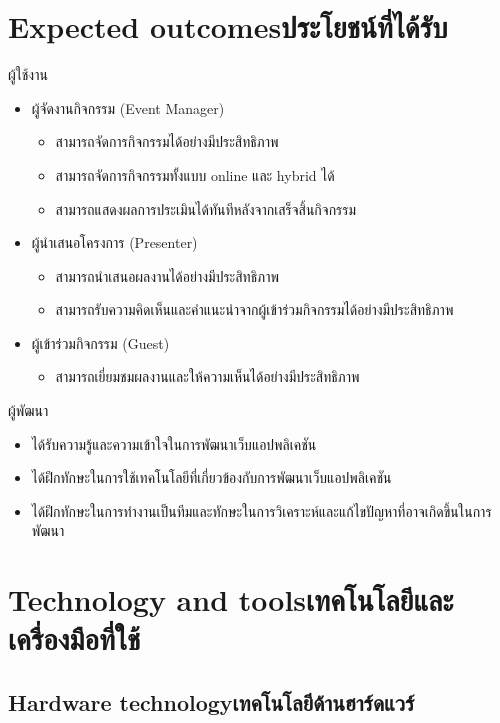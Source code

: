 \section{\ifenglish Expected outcomes\else ประโยชน์ที่ได้รับ\fi}
ผู้ใช้งาน
\begin{itemize}
    \item ผู้จัดงานกิจกรรม (Event Manager)
          \begin{itemize}
              \item สามารถจัดการกิจกรรมได้อย่างมีประสิทธิภาพ
              \item สามารถจัดการกิจกรรมทั้งแบบ online และ hybrid ได้
              \item สามารถแสดงผลการประเมินได้ทันทีหลังจากเสร็จสิ้นกิจกรรม
          \end{itemize}
    \item ผู้นำเสนอโครงการ (Presenter)
          \begin{itemize}
              \item สามารถนำเสนอผลงานได้อย่างมีประสิทธิภาพ
              \item สามารถรับความคิดเห็นและคำแนะนำจากผู้เข้าร่วมกิจกรรมได้อย่างมีประสิทธิภาพ
          \end{itemize}
    \item ผู้เข้าร่วมกิจกรรม (Guest)
          \begin{itemize}
              \item สามารถเยี่ยมชมผลงานและให้ความเห็นได้อย่างมีประสิทธิภาพ
          \end{itemize}
\end{itemize}
ผู้พัฒนา
\begin{itemize}
    \item ได้รับความรู้และความเข้าใจในการพัฒนาเว็บแอปพลิเคชัน
    \item ได้ฝึกทักษะในการใช้เทคโนโลยีที่เกี่ยวข้องกับการพัฒนาเว็บแอปพลิเคชัน
    \item ได้ฝึกทักษะในการทำงานเป็นทีมและทักษะในการวิเคราะห์และแก้ไขปัญหาที่อาจเกิดขึ้นในการพัฒนา
\end{itemize}

\section{\ifenglish Technology and tools\else เทคโนโลยีและเครื่องมือที่ใช้\fi}

\subsection{\ifenglish Hardware technology\else เทคโนโลยีด้านฮาร์ดแวร์\fi}

